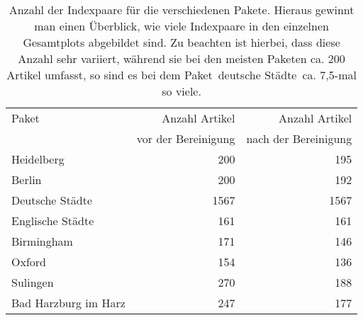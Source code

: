 \documentclass[fontsize=11pt, twoside, a4paper]{scrartcl}
\begin{document}
\begin{table}[H]
	\centering
\caption{Anzahl der Indexpaare für die verschiedenen Pakete. Hieraus gewinnt man einen Überblick, wie viele Indexpaare in den einzelnen Gesamtplots abgebildet sind. Zu beachten ist hierbei, dass diese Anzahl sehr variiert, während sie bei den meisten Paketen ca. 200 Artikel umfasst, so sind es bei dem Paket \,\glqq deutsche Städte\grqq\, ca. 7,5-mal so viele.}
	\begin{tabular}{|l|r|r|}
		\hline
		Paket & Anzahl Artikel & Anzahl Artikel \\
		 & vor der Bereinigung & nach der Bereinigung \\
		\hline
		Heidelberg & 200 & 195  \\
		Berlin & 200 & 192 \\
		Deutsche Städte & 1567 & 1567 \\
		Englische Städte & 161 & 161 \\
		Birmingham & 171 & 146 \\
		Oxford & 154 & 136 \\ 
		Sulingen & 270 & 188 \\
		Bad Harzburg im Harz & 247 & 177 \\
		\hline
	\end{tabular}
	\label{AnzahlIndexpaare}
\end{table}
\end{document}
